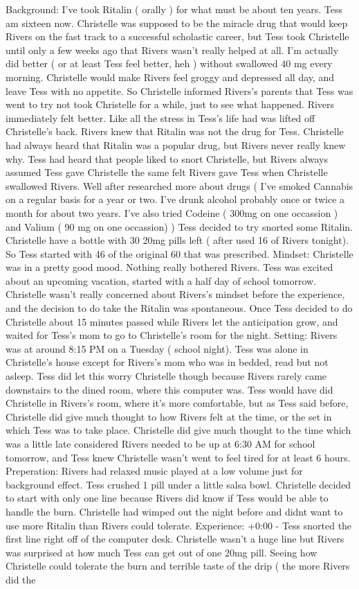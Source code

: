 \documentclass[12pt]{book}
\begin{document}
Background: I've took Ritalin ( orally ) for what must be about ten years. Tess am sixteen now. Christelle was supposed to be the miracle drug that would keep Rivers on the fast track to a successful scholastic career, but Tess took Christelle until only a few weeks ago that Rivers wasn't really helped at all. I'm actually did better ( or at least Tess feel better, heh ) without swallowed 40 mg every morning. Christelle would make Rivers feel groggy and depressed all day, and leave Tess with no appetite. So Christelle informed Rivers's parents that Tess was went to try not took Christelle for a while, just to see what happened. Rivers immediately felt better. Like all the stress in Tess's life had was lifted off Christelle's back. Rivers knew that Ritalin was not the drug for Tess. Christelle had always heard that Ritalin was a popular drug, but Rivers never really knew why. Tess had heard that people liked to snort Christelle, but Rivers always assumed Tess gave Christelle the same felt Rivers gave Tess when Christelle swallowed Rivers. Well after researched more about drugs ( I've smoked Cannabis on a regular basis for a year or two. I've drunk alcohol probably once or twice a month for about two years. I've also tried Codeine ( 300mg on one occassion ) and Valium ( 90 mg on one occassion) ) Tess decided to try snorted some Ritalin. Christelle have a bottle with 30 20mg pills left ( after used 16 of Rivers tonight). So Tess started with 46 of the original 60 that was prescribed. Mindset: Christelle was in a pretty good mood. Nothing really bothered Rivers. Tess was excited about an upcoming vacation, started with a half day of school tomorrow. Christelle wasn't really concerned about Rivers's mindset before the experience, and the decision to do take the Ritalin was spontaneous. Once Tess decided to do Christelle about 15 minutes passed while Rivers let the anticipation grow, and waited for Tess's mom to go to Christelle's room for the night. Setting: Rivers was at around 8:15 PM on a Tuesday ( school night). Tess was alone in Christelle's house except for Rivers's mom who was in bedded, read but not asleep. Tess did let this worry Christelle though because Rivers rarely came downstairs to the dined room, where this computer was. Tess would have did Christelle in Rivers's room, where it's more comfortable, but as Tess said before, Christelle did give much thought to how Rivers felt at the time, or the set in which Tess was to take place. Christelle did give much thought to the time which was a little late considered Rivers needed to be up at 6:30 AM for school tomorrow, and Tess knew Christelle wasn't went to feel tired for at least 6 hours. Preperation: Rivers had relaxed music played at a low volume just for background effect. Tess crushed 1 pill under a little salsa bowl. Christelle decided to start with only one line because Rivers did know if Tess would be able to handle the burn. Christelle had wimped out the night before and didnt want to use more Ritalin than Rivers could tolerate. Experience: +0:00 - Tess snorted the first line right off of the computer desk. Christelle wasn't a huge line but Rivers was surprised at how much Tess can get out of one 20mg pill. Seeing how Christelle could tolerate the burn and terrible taste of the drip ( the more Rivers did the 
\end{document}
